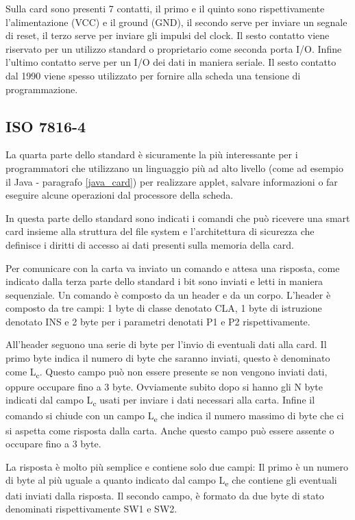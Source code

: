 Sulla card sono presenti 7 contatti, il primo e il quinto sono rispettivamente l'alimentazione (VCC) e il ground (GND), il secondo serve per inviare un segnale di reset, il terzo serve per inviare gli impulsi del clock. Il sesto contatto viene riservato per un utilizzo standard o proprietario come seconda porta I/O. Infine l'ultimo contatto serve per un I/O dei dati in maniera seriale. Il sesto contatto dal 1990 viene spesso utilizzato per fornire alla scheda una tensione di programmazione.
\cite{isoiec3}

\subsection{ISO 7816-4}
La quarta parte dello standard è sicuramente la più interessante per i programmatori che utilizzano un linguaggio più ad alto livello (come ad esempio il Java - paragrafo \ref{java_card}) per realizzare applet, salvare informazioni o far eseguire alcune operazioni dal processore della scheda.

In questa parte dello standard sono indicati i comandi che può ricevere una smart card insieme alla struttura del file system e l'architettura di sicurezza che definisce i diritti di accesso ai dati presenti sulla memoria della card.

Per comunicare con la carta va inviato un comando e attesa una risposta, come indicato dalla terza parte dello standard i bit sono inviati e letti in maniera sequenziale. Un comando è composto da un header e da un corpo. L'header è composto da tre campi: 1 byte di classe denotato CLA, 1 byte di istruzione denotato INS e 2 byte per i parametri denotati P1 e P2 rispettivamente.

All'header seguono una serie di byte per l'invio di eventuali dati alla card. Il primo byte indica il numero di byte che saranno inviati, questo è denominato come L\textsubscript{c}. Questo campo può non essere presente se non vengono inviati dati, oppure occupare fino a 3 byte. Ovviamente subito dopo si hanno gli N byte indicati dal campo L\textsubscript{c} usati per inviare i dati necessari alla carta. Infine il comando si chiude con un campo L\textsubscript{e} che indica il numero massimo di byte che ci si aspetta come risposta dalla carta. Anche questo campo può essere assente o occupare fino a 3 byte.

La risposta è molto più semplice e contiene solo due campi: Il primo è un numero di byte al più uguale a quanto indicato dal campo L\textsubscript{e} che contiene gli eventuali dati inviati dalla risposta. Il secondo campo, è formato da due byte di stato denominati rispettivamente SW1 e SW2.

